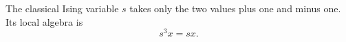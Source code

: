 \documentclass{article}
\begin{document}
The classical Ising variable $s$ takes only the two values plus one and
minus one.  Its local algebra is
\begin{equation}
s^3 x = s x .
\label{eq:ising-idempotence}
\end{equation}
\end{document}
